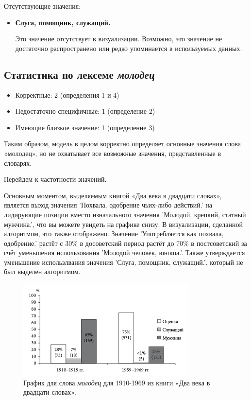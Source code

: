 Отсутствующие значения:

\begin{itemize}
    \item \textbf{Слуга, помощник, служащий.}

    Это значение отсутствует в визуализации.
    Возможно, это значение не достаточно распространено или редко упоминается в используемых данных.
\end{itemize}

\subsection*{Статистика по лексеме \textit{молодец}}
\begin{itemize}
    \item Корректные: 2 (определения 1 и 4)
    \item Недостаточно специфичные: 1 (определение 2)
    \item Имеющие близкое значение: 1 (определение 3)
\end{itemize}

Таким образом, модель в целом корректно определяет основные значения слова «молодец»,
но не охватывает все возможные значения, представленные в словарях.

Перейдем к частотности значений.

Основным моментом, выделяемым книгой «Два века в двадцати словах», является
выход значения ’Похвала, одобрение чьих-либо действий.’ на лидирующие позиции
вместо изначального значения ’Молодой, крепкий, статный мужчина.’, что вы можете увидеть
на графике снизу.
В визуализации, сделанной алгоритмом, это также отображено.
Значение ’Употребляется как похвала, одобрение.’ растёт с 30\% в досоветский период
растёт до 70\% в постсоветский за счёт уменьшения использования ’Молодой человек, юноша.’.
Также утверждается уменьшение использлвания значения ’Слуга, помощник, служащий.’,
который не был выделен алгоритмом.

\begin{figure}[H]
    \centering %
    \includegraphics[width=0.8\textwidth]{img/book/molodets/1910-1969}
    \caption{График для слова \textit{молодец} для 1910-1969 из книги «Два века в двадцати словах».}
\end{figure}

